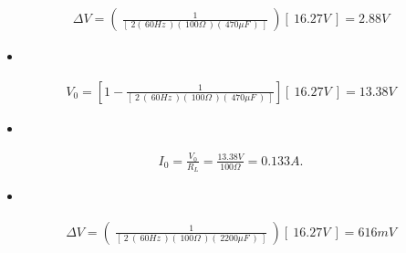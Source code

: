 \begin{ceqn}
\begin{align}
\Delta V = (\ \frac{1}{[\ 2 (\ 60Hz\ )(\ 100\Omega\ )(\ 470\mu F\ )\ ]}\ )[\ 16.27 V\ ] = 2.88 V
\end{align}
\end{ceqn}

\begin{itemize}
\item {\bfseries\itshape{}} \hfill \break
{\bfseries\itshape{}}
\end{itemize}

\begin{ceqn}
\begin{align}
V_{0} = [ 1 - \frac{1}{[\ 2\ (\ 60Hz\ )(\ 100\Omega\ )(\ 470\mu F\ )\ ] }][\ 16.27 V\ ] = 13.38 V
\end{align}
\end{ceqn}

\begin{itemize}
\item {\bfseries\itshape{}} \hfill \break
{\bfseries\itshape{}}
\end{itemize}

\begin{ceqn}
\begin{align}
I_{0} = \frac{V_{0}}{R_{L}} = \frac{13.38V}{100\Omega} = 0.133 A.
\end{align}
\end{ceqn}

\pagebreak

\begin{itemize}
\item {\bfseries\itshape\color{Violet}{Using 2200$\mu F$ capacitor:}} \hfill \break
{\bfseries\itshape{}}
\end{itemize}

\begin{ceqn}
\begin{align}
\Delta V = (\ \frac{1}{[\ 2\ (\ 60Hz\ )(\ 100\Omega\ )(\ 2200\mu F\ )\ ]}\ )[\ 16.27 V\ ] = 616 mV
\end{align}
\end{ceqn}

